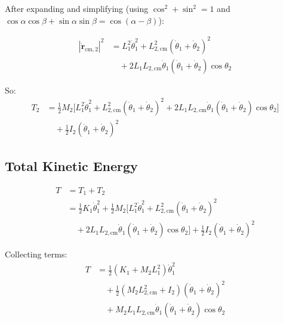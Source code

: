 After expanding and simplifying (using $\cos^2 + \sin^2 = 1$ and $\cos \alpha \cos \beta + \sin \alpha \sin \beta = \cos(\alpha - \beta)$):

\begin{align}
|\dot{\bm{r}}_{\text{cm},2}|^2 &= L_1^2 \dot{\theta}_1^2 + L_{2,\text{cm}}^2 (\dot{\theta}_1 + \dot{\theta}_2)^2 \\
&\quad + 2 L_1 L_{2,\text{cm}} \dot{\theta}_1 (\dot{\theta}_1 + \dot{\theta}_2) \cos \theta_2
\label{eq:ch03_expansion}
\end{align}

So:
\begin{align}
T_2 &= \frac{1}{2} M_2 \big[ L_1^2 \dot{\theta}_1^2 + L_{2,\text{cm}}^2 (\dot{\theta}_1 + \dot{\theta}_2)^2 + 2 L_1 L_{2,\text{cm}} \dot{\theta}_1 (\dot{\theta}_1 + \dot{\theta}_2) \cos \theta_2 \big] \\
&\quad + \frac{1}{2} I_2 (\dot{\theta}_1 + \dot{\theta}_2)^2
\label{eq:ch03_T2_expanded}
\end{align}

\subsection*{Total Kinetic Energy}

\begin{align}
T &= T_1 + T_2 \\
&= \frac{1}{2} K_1 \dot{\theta}_1^2 + \frac{1}{2} M_2 \Big[ L_1^2 \dot{\theta}_1^2 + L_{2,\text{cm}}^2 (\dot{\theta}_1 + \dot{\theta}_2)^2 \\
&\quad + 2 L_1 L_{2,\text{cm}} \dot{\theta}_1 (\dot{\theta}_1 + \dot{\theta}_2) \cos \theta_2 \Big] + \frac{1}{2} I_2 (\dot{\theta}_1 + \dot{\theta}_2)^2
\label{eq:ch03_T_total}
\end{align}

Collecting terms:
\begin{align}
T &= \frac{1}{2} (K_1 + M_2 L_1^2) \dot{\theta}_1^2 \\
&\quad + \frac{1}{2} (M_2 L_{2,\text{cm}}^2 + I_2) (\dot{\theta}_1 + \dot{\theta}_2)^2 \\
&\quad + M_2 L_1 L_{2,\text{cm}} \dot{\theta}_1 (\dot{\theta}_1 + \dot{\theta}_2) \cos \theta_2
\label{eq:ch03_T_rearranged}
\end{align}


